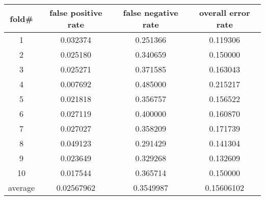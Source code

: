 \documentclass[11pt,a4paper,fleqn]{article}
\begin{document}
\begin{tabular}{|c|c|c|c|}
\hline
fold\#&false positive rate&false negative rate&overall error rate\\
\hline
1&0.032374&0.251366&0.119306\\
\hline
2&0.025180&0.340659&0.150000\\
\hline
3&0.025271&0.371585&0.163043\\
\hline
4&0.007692&0.485000&0.215217\\
\hline
5&0.021818&0.356757&0.156522\\
\hline
6&0.027119&0.400000&0.160870\\
\hline
7&0.027027&0.358209&0.171739\\
\hline
8&0.049123&0.291429&0.141304\\
\hline
9&0.023649&0.329268&0.132609\\
\hline
10&0.017544&0.365714&0.150000\\
\hline
average&0.02567962&0.3549987&0.15606102\\
\hline
\end{tabular}\\
 
\end{document}
